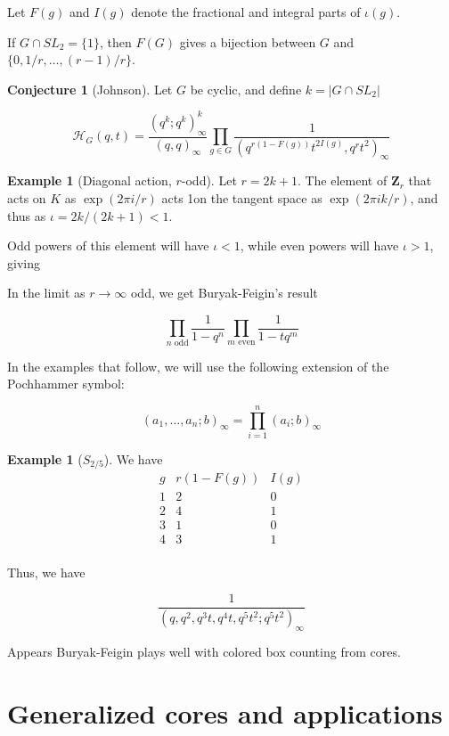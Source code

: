 \documentclass{amsart}[12pt]
\theoremstyle{definition}
\newtheorem{example}[dummy]{Example}
\newtheorem{conjecture}[dummy]{Conjecture}
\newcommand{\Z}{\mathbf{Z}}
\begin{document}
Let $F(g)$ and $I(g)$ denote the fractional and integral parts of $\iota(g)$. 

If $G\cap SL_2=\{1\}$, then $F(G)$ gives a bijection between $G$ and $\{0, 1/r,\dots, (r-1)/r\}$.
\begin{conjecture}[Johnson]
Let $G$ be cyclic, and define $k=|G\cap SL_2|$

$$\mathcal{H}_G(q,t)= \frac{(q^k;q^k)^k_\infty}{(q,q)_\infty} \prod_{g\in G}\frac{1}{(q^{r(1-F(g))} t^{2I(g)},q^rt^2)_\infty}$$

\end{conjecture}


\begin{example}[Diagonal action, $r$-odd]
Let $r=2k+1$.   The element of $\Z_r$ that acts on $K$ as $\exp(2\pi i/r)$ acts 1on the tangent space as $\exp(2\pi i k/r)$, and thus as $\iota=2k/(2k+1)<1$.  

Odd powers of this element will have $\iota<1$, while even powers will have $\iota>1$, giving 

In the limit as $r\to\infty$ odd, we get Buryak-Feigin's result

$$\prod_{n \text{ odd}} \frac{1}{1-q^n}\prod_{m \text{ even}}\frac{1}{1-tq^m}$$
\end{example}

In the examples that follow, we will use the following extension of the Pochhammer symbol:

$$(a_1,\dots, a_n; b)_\infty=\prod_{i=1}^n (a_i;b)_\infty$$

\begin{example}[$S_{2/5}$]
We have
$$\begin{array}{r|c|l}
g & r(1-F(g)) & I(g) \\
\hline
1 & 2 & 0 \\
2 & 4 & 1 \\
3 & 1 & 0 \\
4 & 3 & 1 \\
\end{array}
$$

Thus, we have


$$
\frac{1}{(q, q^2,q^3t, q^4t, q^5t^2; q^5t^2)_\infty}
$$
\end{example}


Appears Buryak-Feigin plays well with colored box counting from cores.



\section{Generalized cores and applications}
\end{document}
